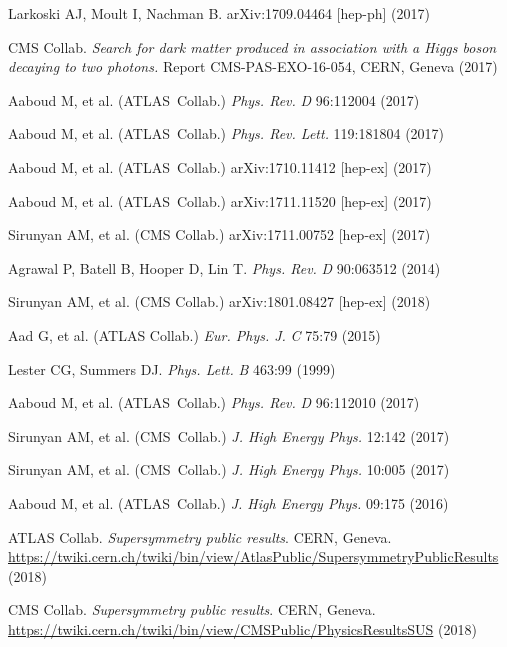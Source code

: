 \documentclass{ar-1col}
\begin{document}
\begin{thebibliography}{175}
Larkoski AJ, Moult I, Nachman B. arXiv:1709.04464 [hep-ph] (2017)

CMS Collab. \textit{Search for dark matter produced in association with a Higgs boson decaying to two photons.}
Report CMS-PAS-EXO-16-054, CERN, Geneva (2017)

Aaboud M, et al. ({ATLAS~Collab}.) \textit{Phys. Rev.} \textit{D} 96:112004 (2017)

Aaboud M, et al. ({ATLAS~Collab}.) \textit{Phys. Rev. Lett.} 119:181804 (2017)

Aaboud M, et al. ({ATLAS~Collab}.) arXiv:1710.11412 [hep-ex] (2017)

Aaboud M, et al. ({ATLAS~Collab}.) arXiv:1711.11520 [hep-ex] (2017)

Sirunyan AM, et al. ({CMS Collab}.) arXiv:1711.00752 [hep-ex] (2017)

Agrawal P, Batell B, Hooper D, Lin T. \textit{Phys. Rev.}
\textit{D} 90:063512 (2014)

Sirunyan AM, et al. ({CMS Collab}.) arXiv:1801.08427 [hep-ex] (2018)

Aad G, et al. ({ATLAS Collab}.) \textit{Eur. Phys. J.} \textit{C} 75:79 (2015)

Lester CG, Summers DJ. \textit{Phys. Lett.} \textit{B} 463:99 (1999)

Aaboud M, et al. ({ATLAS~Collab}.) \textit{Phys. Rev.} \textit{D} 96:112010 (2017)

Sirunyan AM, et al. ({CMS~Collab}.) \textit{J. High Energy Phys.} 12:142 (2017)

Sirunyan AM, et al. ({CMS~Collab}.) \textit{J. High Energy Phys.} 10:005 (2017)

{Aaboud M, et al. (ATLAS~Collab}.) \textit{J. High Energy Phys.} 09:175 (2016)

{ATLAS Collab}. {\textit{Supersymmetry public results}. CERN, Geneva. \url{https://twiki.cern.ch/twiki/bin/view/AtlasPublic/SupersymmetryPublicResults}} (2018)

{CMS Collab}. {\textit{Supersymmetry public results}. CERN, Geneva.
\url{https://twiki.cern.ch/twiki/bin/view/CMSPublic/PhysicsResultsSUS}} (2018)


\end{thebibliography}
\end{document}
